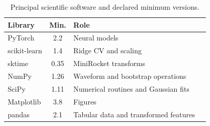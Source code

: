 \begin{table}[tbp]
\centering
\scriptsize
\begin{tabularx}{\columnwidth}{@{}lclX@{}}
\toprule
Library & Min. & Role \\
\midrule
PyTorch & 2.2 & Neural models \\
scikit-learn & 1.4 & Ridge CV and scaling \\
sktime & 0.35 & MiniRocket transforms \\
NumPy & 1.26 & Waveform and bootstrap operations \\
SciPy & 1.11 & Numerical routines and Gaussian fits \\
Matplotlib & 3.8 & Figures \\
pandas & 2.1 & Tabular data and transformed features \\
\bottomrule
\end{tabularx}
\caption{Principal scientific software and declared minimum versions.}
\label{tab:model-libraries}
\end{table}
